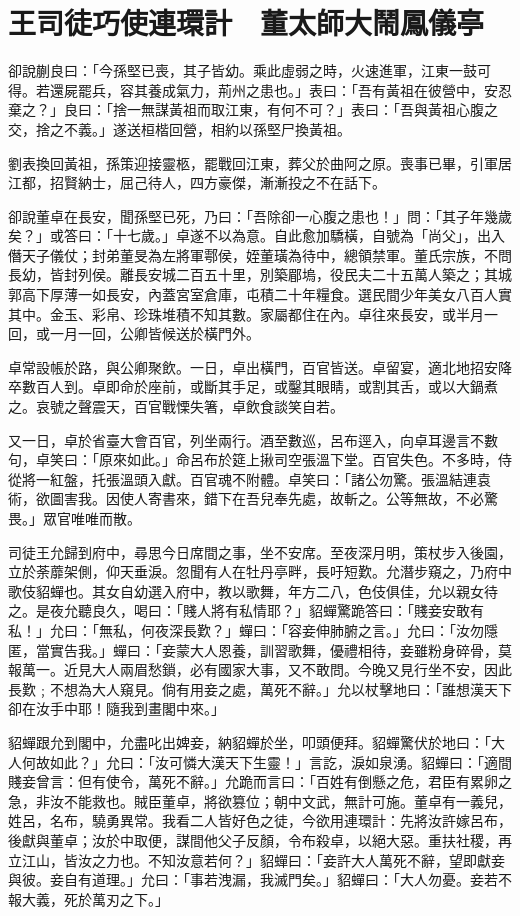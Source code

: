 
\chapter{王司徒巧使連環計　董太師大鬧鳳儀亭}

卻說蒯良曰：「今孫堅已喪，其子皆幼。乘此虛弱之時，火速進軍，江東一鼓可得。若還屍罷兵，容其養成氣力，荊州之患也。」表曰：「吾有黃祖在彼營中，安忍棄之？」良曰：「捨一無謀黃祖而取江東，有何不可？」表曰：「吾與黃祖心腹之交，捨之不義。」遂送桓楷回營，相約以孫堅尸換黃祖。

劉表換回黃祖，孫策迎接靈柩，罷戰回江東，葬父於曲阿之原。喪事已畢，引軍居江都，招賢納士，屈己待人，四方豪傑，漸漸投之不在話下。

卻說董卓在長安，聞孫堅已死，乃曰：「吾除卻一心腹之患也！」問：「其子年幾歲矣？」或答曰：「十七歲。」卓遂不以為意。自此愈加驕橫，自號為「尚父」，出入僭天子儀仗；封弟董旻為左將軍鄠侯，姪董璜為待中，總領禁軍。董氏宗族，不問長幼，皆封列侯。離長安城二百五十里，別築郿塢，役民夫二十五萬人築之；其城郭高下厚薄一如長安，內蓋宮室倉庫，屯積二十年糧食。選民間少年美女八百人實其中。金玉、彩帛、珍珠堆積不知其數。家屬都住在內。卓往來長安，或半月一回，或一月一回，公卿皆候送於橫門外。

卓常設帳於路，與公卿聚飲。一日，卓出橫門，百官皆送。卓留宴，適北地招安降卒數百人到。卓即命於座前，或斷其手足，或鑿其眼睛，或割其舌，或以大鍋煮之。哀號之聲震天，百官戰慄失箸，卓飲食談笑自若。

又一日，卓於省臺大會百官，列坐兩行。酒至數巡，呂布逕入，向卓耳邊言不數句，卓笑曰：「原來如此。」命呂布於筵上揪司空張溫下堂。百官失色。不多時，侍從將一紅盤，托張溫頭入獻。百官魂不附體。卓笑曰：「諸公勿驚。張溫結連袁術，欲圖害我。因使人寄書來，錯下在吾兒奉先處，故斬之。公等無故，不必驚畏。」眾官唯唯而散。

司徒王允歸到府中，尋思今日席間之事，坐不安席。至夜深月明，策杖步入後園，立於荼蘼架側，仰天垂淚。忽聞有人在牡丹亭畔，長吁短歎。允潛步窺之，乃府中歌伎貂蟬也。其女自幼選入府中，教以歌舞，年方二八，色伎俱佳，允以親女待之。是夜允聽良久，喝曰：「賤人將有私情耶？」貂蟬驚跪答曰：「賤妾安敢有私！」允曰：「無私，何夜深長歎？」蟬曰：「容妾伸肺腑之言。」允曰：「汝勿隱匿，當實告我。」蟬曰：「妾蒙大人恩養，訓習歌舞，優禮相待，妾雖粉身碎骨，莫報萬一。近見大人兩眉愁鎖，必有國家大事，又不敢問。今晚又見行坐不安，因此長歎﹔不想為大人窺見。倘有用妾之處，萬死不辭。」允以杖擊地曰：「誰想漢天下卻在汝手中耶！隨我到畫閣中來。」

貂蟬跟允到閣中，允盡叱出婢妾，納貂蟬於坐，叩頭便拜。貂蟬驚伏於地曰：「大人何故如此？」允曰：「汝可憐大漢天下生靈！」言訖，淚如泉湧。貂蟬曰：「適間賤妾曾言：但有使令，萬死不辭。」允跪而言曰：「百姓有倒懸之危，君臣有累卵之急，非汝不能救也。賊臣董卓，將欲篡位；朝中文武，無計可施。董卓有一義兒，姓呂，名布，驍勇異常。我看二人皆好色之徒，今欲用連環計：先將汝許嫁呂布，後獻與董卓；汝於中取便，謀間他父子反顏，令布殺卓，以絕大惡。重扶社稷，再立江山，皆汝之力也。不知汝意若何？」貂蟬曰：「妾許大人萬死不辭，望即獻妾與彼。妾自有道理。」允曰：「事若洩漏，我滅門矣。」貂蟬曰：「大人勿憂。妾若不報大義，死於萬刃之下。」

